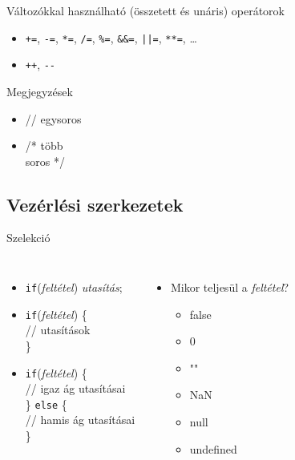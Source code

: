 \begin{frame}
    Változókkal használható (összetett és unáris) operátorok
    \begin{itemize}
        \item \texttt{+=}, \texttt{-=}, \texttt{*=}, \texttt{/=}, \texttt{\%=}, \texttt{\&\&=}, \texttt{||=}, \texttt{**=}, \dots 
        \item \texttt{++}, \texttt{-{-}}
    \end{itemize}
    \vfill
    Megjegyzések
    \begin{itemize}
        \item // egysoros
        \item /* több \\ \quad soros */
    \end{itemize}
\end{frame}

\subsection{Vezérlési szerkezetek}

\begin{frame}
    Szelekció
    \begin{columns}[T]
        \begin{itemize}
          \item \texttt{if}(\emph{feltétel}) \emph{utasítás};
          \item \texttt{if}(\emph{feltétel}) \{\\
          \qquad // utasítások \\
          \}
          \item \texttt{if}(\emph{feltétel}) \{ \\
            \qquad // igaz ág utasításai \\
            \} \texttt{else} \{ \\
            \qquad // hamis ág utasításai \\
            \}
        \end{itemize}
        \begin{itemize}
          \item Mikor  teljesül a \emph{feltétel}?
          \begin{itemize}
            \item false
            \item 0
            \item ""
            \item NaN
            \item null
            \item undefined
          \end{itemize}
        \end{itemize}
      \end{columns}
\end{frame}

